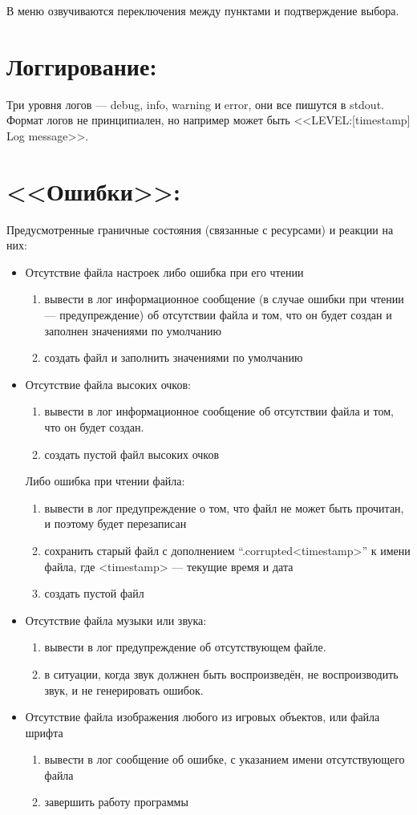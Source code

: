 \documentclass[12pt,a4paper]{article}
\begin{document}
В меню озвучиваются переключения между пунктами и подтверждение выбора.\\

\section{Логгирование:}
Три уровня логов --- debug, info, warning и error, они все пишутся в stdout. Формат логов не принципиален, но например может быть <<LEVEL:[timestamp] Log message>>.\\

\section{<<Ошибки>>:}
Предусмотренные граничные состояния (связанные с ресурсами) и реакции на них:
\begin{itemize}
\item Отсутствие файла настроек либо ошибка при его чтении
  \begin{enumerate}
  \item вывести в лог информационное сообщение (в случае ошибки при чтении --- предупреждение) об отсутствии файла и том, что он будет создан и заполнен значениями по умолчанию
  \item создать файл и заполнить значениями по умолчанию
  \end{enumerate}
\item Отсутствие файла высоких очков:
  \begin{enumerate}
  \item вывести в лог информационное сообщение об отсутствии файла и том, что он будет создан.
  \item создать пустой файл высоких очков
  \end{enumerate}
  Либо ошибка при чтении файла:
  \begin{enumerate}
  \item вывести в лог предупреждение о том, что файл не может быть прочитан, и поэтому будет перезаписан
  \item сохранить старый файл с дополнением ``.corrupted<timestamp>'' к имени файла, где <timestamp> --- текущие время и дата
  \item создать пустой файл
  \end{enumerate}
\item Отсутствие файла музыки или звука:
  \begin{enumerate}
  \item вывести в лог предупреждение об отсутствующем файле.
  \item в ситуации, когда звук должнен быть воспроизведён, не воспроизводить звук, и не генерировать ошибок.
  \end{enumerate}
\item Отсутствие файла изображения любого из игровых объектов, или файла шрифта
  \begin{enumerate}
  \item вывести в лог сообщение об ошибке, с указанием имени отсутствующего файла
  \item завершить работу программы
  \end{enumerate}
\end{itemize}
\end{document}
